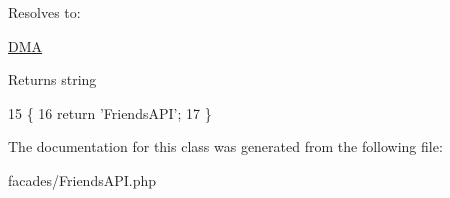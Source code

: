 Resolves to\+:
\begin{DoxyItemize}
\item \hyperlink{namespaceDMA}{D\+M\+A}
\end{DoxyItemize}

\begin{DoxyReturn}{Returns}
string 
\end{DoxyReturn}

\begin{DoxyCode}
15                                                  \{ 
16         \textcolor{keywordflow}{return} \textcolor{stringliteral}{'FriendsAPI'};
17     \}
\end{DoxyCode}


The documentation for this class was generated from the following file\+:\begin{DoxyCompactItemize}
\item 
facades/Friends\+A\+P\+I.\+php\end{DoxyCompactItemize}
